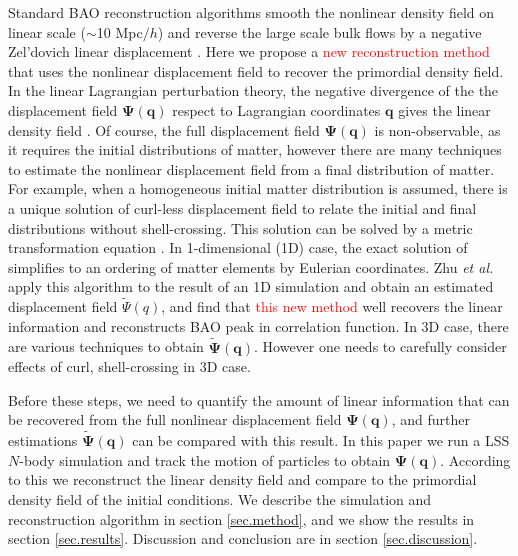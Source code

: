 \documentclass[aps,prd,twocolumn,superscriptaddress,amsfont,amssymb,amsmath,nofootinbib,showpacs,balancelastpage]{revtex4-1}
\newcommand{\bs}{\boldsymbol}
\newcommand{\tcr}{\textcolor{red}}
\begin{document}
Standard BAO reconstruction algorithms smooth the 
nonlinear density field on linear scale ($\sim$10 Mpc$/h$) and reverse the large 
scale bulk flows by a negative Zel'dovich linear displacement
\citep{2007ApJ...664..675E,2009PhRvD..80l3501N,2009PhRvD..79f3523P}. Here we propose a 
\tcr{new reconstruction method} that uses the nonlinear displacement field to recover the 
primordial density field. In the linear Lagrangian perturbation theory, the 
negative divergence of the the displacement field
$\bs\Psi(\bs q)$ respect to Lagrangian coordinates $\bs q$
gives the linear density field \tcr{\citep{2010PhDT.........4J}}.
Of course, the full displacement field $\bs\Psi(\bs q)$
is non-observable, as it requires the initial distributions of matter, however there are 
many techniques to estimate the nonlinear displacement field from a final 
distribution of matter. For example, when a homogeneous initial matter distribution 
is assumed, there is a unique solution of curl-less displacement field to relate 
the initial and final distributions without shell-crossing. This solution can be 
solved by a metric transformation equation \citep{1995ApJS..100..269P,1998ApJS..115...19P}.
In 1-dimensional (1D) case, the exact solution of \cite{1995ApJS..100..269P}
simplifies to an ordering of matter elements by Eulerian coordinates.
Zhu {\it et al.} \cite{2016arXiv160907041Z} apply this algorithm to the result
of an 1D simulation \citep{2016JCAP...01..043M} and obtain an estimated
displacement field $\tilde\Psi(q)$, and find that \tcr{this new method} well recovers the linear
information and reconstructs BAO peak in correlation function. 
In 3D case, there are various techniques to obtain $\tilde{\bs \Psi}(\bs q)$.
However one needs to carefully consider effects of curl, shell-crossing in 3D case.

Before these steps, we need to quantify the amount of linear information
that can be recovered from the full nonlinear displacement field $\bs\Psi(\bs q)$,
and further estimations $\tilde{\bs \Psi}(\bs q)$ can be compared with this result.
In this paper we run a LSS $N$-body simulation and track the motion of
particles to obtain $\bs\Psi(\bs q)$. According to this we reconstruct the linear density
field and compare to the primordial density field of the initial
conditions. We describe the simulation and reconstruction algorithm in section
\ref{sec.method}, and we show the results in section \ref{sec.results}.
Discussion and conclusion are in section \ref{sec.discussion}.
\end{document}
